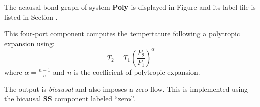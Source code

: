 

   The acausal bond graph of system \textbf{Poly} is
   displayed in Figure  and its label
   file is listed in Section .

This four-port component computes the tempertature following a
polytropic expansion using:
\begin{equation}
  T_2 = T_1 \left ( \frac{P_2}{P_1} \right )^\alpha
\end{equation}
where $\alpha = \frac{n-1}{n}$ and $n$ is the coefficient of
polytropic expansion.

The output is \emph{bicausal} and also imposes a zero flow. This is
implemented using the bicausal \textbf{SS} component labeled ``zero''.

